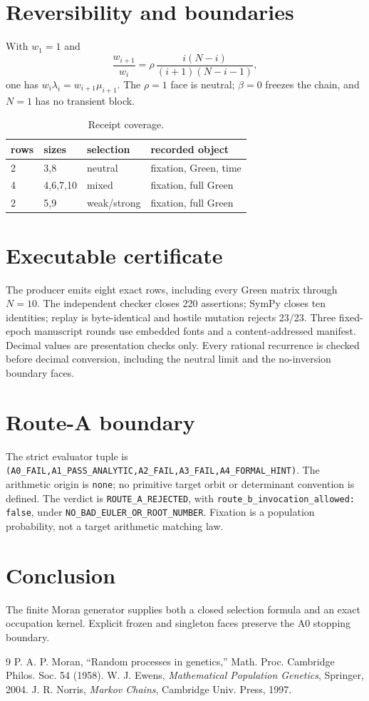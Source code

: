\documentclass[10pt]{article}
\begin{document}
\section{Reversibility and boundaries}
With $w_1=1$ and
\[
\frac{w_{i+1}}{w_i}=\rho\,\frac{i(N-i)}{(i+1)(N-i-1)}, \tag{3}
\]
one has $w_i\lambda_i=w_{i+1}\mu_{i+1}$. The $\rho=1$ face is neutral;
$\beta=0$ freezes the chain, and $N=1$ has no transient block.
\begin{table}[htbp]
\centering\small
\caption{Receipt coverage.}
\begin{tabular}{llll}
\toprule
rows & sizes & selection & recorded object\\
\midrule
2 & 3,8 & neutral & fixation, Green, time\\
4 & 4,6,7,10 & mixed & fixation, full Green\\
2 & 5,9 & weak/strong & fixation, full Green\\
\bottomrule
\end{tabular}
\end{table}
\section{Executable certificate}
The producer emits eight exact rows, including every Green matrix through
$N=10$. The independent checker closes 220 assertions; SymPy closes ten
identities; replay is byte-identical and hostile mutation rejects 23/23.
Three fixed-epoch manuscript rounds use embedded fonts and a content-addressed
manifest. Decimal values are presentation checks only. Every rational
recurrence is checked before decimal conversion, including the neutral limit
and the no-inversion boundary faces.
\section{Route-A boundary}
The strict evaluator tuple is
\texttt{(A0\_FAIL,A1\_PASS\_ANALYTIC,A2\_FAIL,A3\_FAIL,A4\_FORMAL\_HINT)}.
The arithmetic origin is \texttt{none}; no primitive target orbit or
determinant convention is defined. The verdict is
\texttt{ROUTE\_A\_REJECTED}, with \texttt{route\_b\_invocation\_allowed: false},
under \texttt{NO\_BAD\_EULER\_OR\_ROOT\_NUMBER}. Fixation is a population
probability, not a target arithmetic matching law.
\section{Conclusion}
The finite Moran generator supplies both a closed selection formula and an
exact occupation kernel. Explicit frozen and singleton faces preserve the A0
stopping boundary.
\begin{thebibliography}{9}
 P. A. P. Moran, ``Random processes in genetics,'' Math.
Proc. Cambridge Philos. Soc. 54 (1958).
 W. J. Ewens, \emph{Mathematical Population Genetics},
Springer, 2004.
 J. R. Norris, \emph{Markov Chains}, Cambridge Univ. Press,
1997.
\end{thebibliography}
\end{document}
